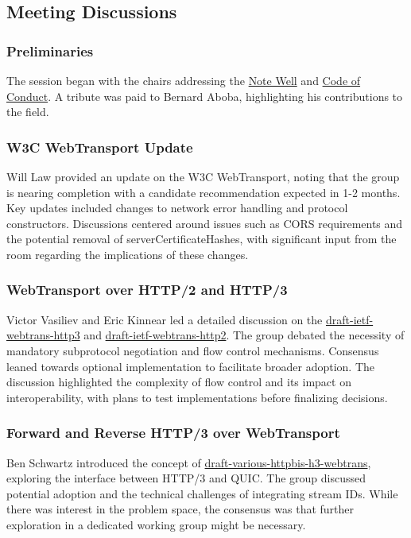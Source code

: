\documentclass{article}
\begin{document}
\subsection{Meeting Discussions}

\subsubsection{Preliminaries}
The session began with the chairs addressing the \href{https://www.ietf.org/about/note-well/}{Note Well} and \href{https://www.rfc-editor.org/rfc/rfc7154.html}{Code of Conduct}. A tribute was paid to Bernard Aboba, highlighting his contributions to the field.

\subsubsection{W3C WebTransport Update}
Will Law provided an update on the W3C WebTransport, noting that the group is nearing completion with a candidate recommendation expected in 1-2 months. Key updates included changes to network error handling and protocol constructors. Discussions centered around issues such as CORS requirements and the potential removal of serverCertificateHashes, with significant input from the room regarding the implications of these changes.

\subsubsection{WebTransport over HTTP/2 and HTTP/3}
Victor Vasiliev and Eric Kinnear led a detailed discussion on the \href{https://datatracker.ietf.org/doc/html/draft-ietf-webtrans-http3}{draft-ietf-webtrans-http3} and \href{https://datatracker.ietf.org/doc/html/draft-ietf-webtrans-http2}{draft-ietf-webtrans-http2}. The group debated the necessity of mandatory subprotocol negotiation and flow control mechanisms. Consensus leaned towards optional implementation to facilitate broader adoption. The discussion highlighted the complexity of flow control and its impact on interoperability, with plans to test implementations before finalizing decisions.

\subsubsection{Forward and Reverse HTTP/3 over WebTransport}
Ben Schwartz introduced the concept of \href{https://datatracker.ietf.org/doc/html/draft-various-httpbis-h3-webtrans/}{draft-various-httpbis-h3-webtrans}, exploring the interface between HTTP/3 and QUIC. The group discussed potential adoption and the technical challenges of integrating stream IDs. While there was interest in the problem space, the consensus was that further exploration in a dedicated working group might be necessary.
\end{document}
